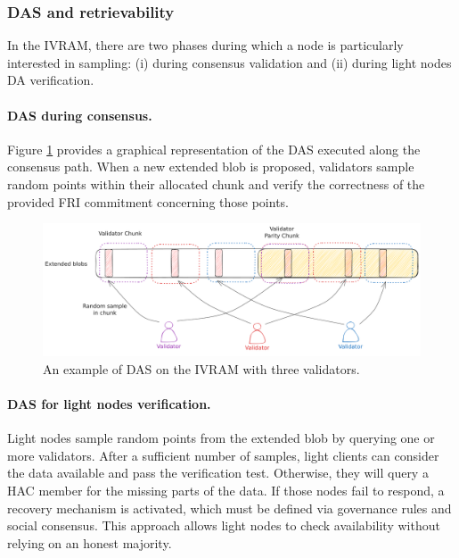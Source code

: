\documentclass[11pt]{article}
\begin{document}
\subsubsection{DAS and retrievability}
In the IVRAM, there are two phases during which a node is particularly interested in sampling: (i) during consensus validation and (ii) during light nodes DA verification.

\paragraph{DAS during consensus.} Figure \ref{fig:yoda-das} provides a graphical representation of the DAS executed along the consensus path. When a new extended blob is proposed, validators sample random points within their allocated chunk and verify the correctness of the provided FRI commitment concerning those points.

\begin{figure}[htp]
    \centering
    \includegraphics[scale=0.2]{images/das-ivram.pdf}
    \caption{An example of DAS on the IVRAM with three validators.}
    \label{fig:yoda-das}
\end{figure}

\paragraph{DAS for light nodes verification.} Light nodes sample random points from the extended blob by querying one or more validators. After a sufficient number of samples, light clients can consider the data available and pass the verification test. Otherwise, they will query a HAC member for the missing parts of the data. If those nodes fail to respond, a recovery mechanism is activated, which must be defined via governance rules and social consensus. This approach allows light nodes to check availability without relying on an honest majority.
\end{document}

